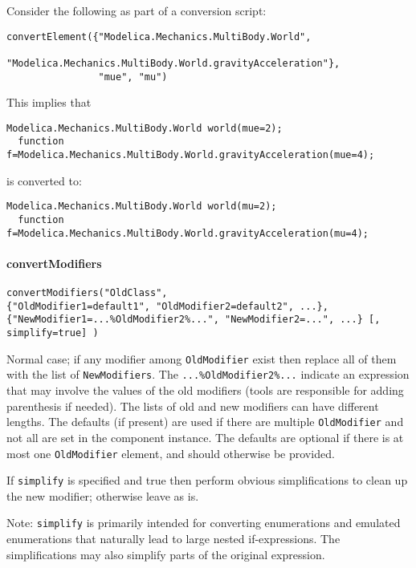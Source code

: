 \begin{example}
Consider the following as part of a conversion script:
\begin{lstlisting}[language=modelica]
convertElement({"Modelica.Mechanics.MultiBody.World",
                "Modelica.Mechanics.MultiBody.World.gravityAcceleration"},
                "mue", "mu")
\end{lstlisting}
This implies that
\begin{lstlisting}[language=modelica]
  Modelica.Mechanics.MultiBody.World world(mue=2);
  function f=Modelica.Mechanics.MultiBody.World.gravityAcceleration(mue=4);
\end{lstlisting}
is converted to:
\begin{lstlisting}[language=modelica]
  Modelica.Mechanics.MultiBody.World world(mu=2);
  function f=Modelica.Mechanics.MultiBody.World.gravityAcceleration(mu=4);
\end{lstlisting}
\end{example}

\paragraph*{convertModifiers}

\begin{lstlisting}[language=modelica]
convertModifiers("OldClass",
{"OldModifier1=default1", "OldModifier2=default2", ...},
{"NewModifier1=...%OldModifier2%...", "NewModifier2=...", ...} [, simplify=true] )
\end{lstlisting}

Normal case; if any modifier among \lstinline!OldModifier! exist then replace all of
them with the list of \lstinline!NewModifiers!. The \lstinline!...%OldModifier2%...! indicate an expression that may
involve the values of the old modifiers (tools are responsible for adding parenthesis if needed).
The lists of old and new modifiers can have different lengths.
The defaults (if present) are used if there
are multiple \lstinline!OldModifier! and not all are set in the component instance.
The defaults are optional if there is at most one \lstinline!OldModifier! element, and should otherwise be provided.

If \lstinline!simplify! is specified and true then perform obvious simplifications
to clean up the new modifier; otherwise leave as is.
\begin{nonnormative}
Note: \lstinline!simplify! is primarily intended for converting enumerations and emulated
enumerations that naturally lead to large nested if-expressions. The
simplifications may also simplify parts of the original expression.
\end{nonnormative}

